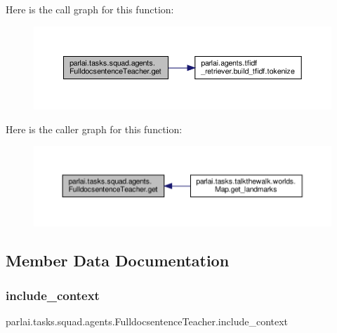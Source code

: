 Here is the call graph for this function\+:
\nopagebreak
\begin{figure}[H]
\begin{center}
\leavevmode
\includegraphics[width=350pt]{classparlai_1_1tasks_1_1squad_1_1agents_1_1FulldocsentenceTeacher_a60f31f40d228baf2a27eb4e1e2e1c213_cgraph}
\end{center}
\end{figure}
Here is the caller graph for this function\+:
\nopagebreak
\begin{figure}[H]
\begin{center}
\leavevmode
\includegraphics[width=350pt]{classparlai_1_1tasks_1_1squad_1_1agents_1_1FulldocsentenceTeacher_a60f31f40d228baf2a27eb4e1e2e1c213_icgraph}
\end{center}
\end{figure}


\subsection{Member Data Documentation}
\mbox{\label{classparlai_1_1tasks_1_1squad_1_1agents_1_1FulldocsentenceTeacher_a1861bd0d07fa2488073e0292513187dc}} 
\subsubsection{\texorpdfstring{include\+\_\+context}{include\_context}}
{\footnotesize\ttfamily parlai.\+tasks.\+squad.\+agents.\+Fulldocsentence\+Teacher.\+include\+\_\+context}




